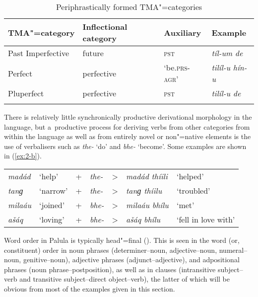 \begin{table}[ht]
\caption{Periphrastically formed TMA"=categories}
\begin{tabularx}{\textwidth}{ l l Q Q }
\lsptoprule
TMA"=category &
Inflectional category &
Auxiliary &
Example \\\hline
Past Imperfective &
future &
\textsc{pst} &
\textit{tíl-um de} \\
Perfect &
perfective &
`be.\textsc{prs-agr}' &
\textit{tilíl-u hín-u} \\
Pluperfect &
perfective &
\textsc{pst} &
\textit{tilíl-u de} \\\lspbottomrule
\end{tabularx}
\label{tab:2-peri}
\end{table}


There is relatively little synchronically productive derivational morphology in the language, but a~productive process for deriving verbs from other categories from within the language as well as from entirely novel or non"=native elements is the use of verbalisers such as \textit{the-} `do' and \textit{bhe-} `become'. Some examples are shown in (\ref{ex:2-b}).


\begin{exe}
\extab
\label{ex:2-b}
\begin{tabularx}{116mm}{ l l l l l l l}
\textit{madád} &
`help' &
+ &
\textit{the-} &
{\textgreater} &
\textit{madád thíili} &
`helped'\\
\textit{tanɡ} &
`narrow' &
+ &
\textit{the-} &
{\textgreater} &
\textit{tanɡ thíilu} &
`troubled'\\
\textit{milaáu} &
`joined' &
+ &
\textit{bhe-} &
{\textgreater} &
\textit{milaáu bhílu} &
`met'\\
\textit{ašáq} &
`loving' &
+ &
\textit{bhe-} &
{\textgreater} &
\textit{ašáq bhílu} &
`fell in love with'\\
\end{tabularx}
\end{exe}


Word order in Palula is typically head"=final (). This is seen in the word (or, constituent) order in noun phrases (determiner--noun, adjective--noun, numeral--noun, genitive--noun), adjective phrases (adjunct--adjective), and adpositional phrases (noun phrase--postposition), as well as in clauses (intransitive subject--verb and transitive subject--direct object--verb), the latter of which will be obvious from most of the examples given in this section.


